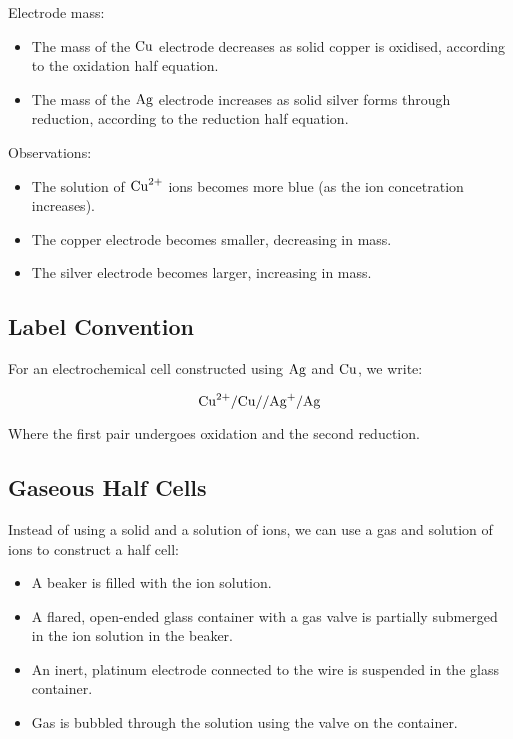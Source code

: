 \documentclass[a4paper,11pt]{article}
\begin{document}
Electrode mass:

\begin{itemize}
\item The mass of the $\ce{Cu}$ electrode decreases as solid copper is oxidised,
	according to the oxidation half equation.
\item The mass of the $\ce{Ag}$ electrode increases as solid silver forms
	through reduction, according to the reduction half equation.
\end{itemize}

Observations:

\begin{itemize}
\item The solution of $\ce{Cu^{2+}}$ ions becomes more blue (as the ion
	concetration increases).
\item The copper electrode becomes smaller, decreasing in mass.
\item The silver electrode becomes larger, increasing in mass.
\end{itemize}

\subsection{Label Convention}

For an electrochemical cell constructed using $\ce{Ag}$ and $\ce{Cu}$, we write:

$$
\ce{Cu^{2+}} / \ce{Cu} // \ce{Ag+} / \ce{Ag}
$$

Where the first pair undergoes oxidation and the second reduction.

\subsection{Gaseous Half Cells}


Instead of using a solid and a solution of ions, we can use a gas and solution
of ions to construct a half cell:

\begin{itemize}
\item A beaker is filled with the ion solution.
\item A flared, open-ended glass container with a gas valve is partially
	submerged in the ion solution in the beaker.
\item An inert, platinum electrode connected to the wire is suspended in the
	glass container.
\item Gas is bubbled through the solution using the valve on the container.
\end{itemize}
\end{document}
